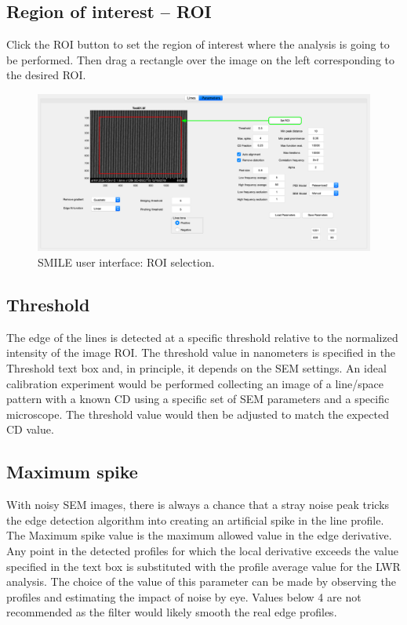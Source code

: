 \documentclass[12pt, a4paper, openany]{report}
\begin{document}
\subsection{Region of interest -- ROI}
Click the ROI button to set the region of interest where the analysis is going to be performed. Then drag a rectangle over the image on the left corresponding to the desired ROI. 
\begin{figure}[hbt]
	\includegraphics[width=\textwidth]{figures/select_ROI.png}
	\caption{SMILE user interface: ROI selection.}
	\label{fig:select_ROI}
\end{figure}
\subsection{Threshold}
The edge of the lines is detected at a specific threshold relative to the normalized intensity of the image ROI. The threshold value in nanometers is specified in the Threshold text box and, in principle, it depends on the SEM settings. An ideal calibration experiment would be performed collecting an image of a line/space pattern with a known CD using a specific set of SEM parameters and a specific microscope. The threshold value would then be adjusted to match the expected CD value.
\subsection{Maximum spike}
With noisy SEM images, there is always a chance that a stray noise peak tricks the edge detection algorithm into creating an artificial spike in the line profile. The Maximum spike value is the maximum allowed value in the edge derivative. Any point in the detected profiles for which the local derivative exceeds the value specified in the text box is substituted with the profile average value for the LWR analysis. The choice of the value of this parameter can be made by observing the profiles and estimating the impact of noise by eye. Values below 4 are not recommended as the filter would likely smooth the real edge profiles.
\end{document}
